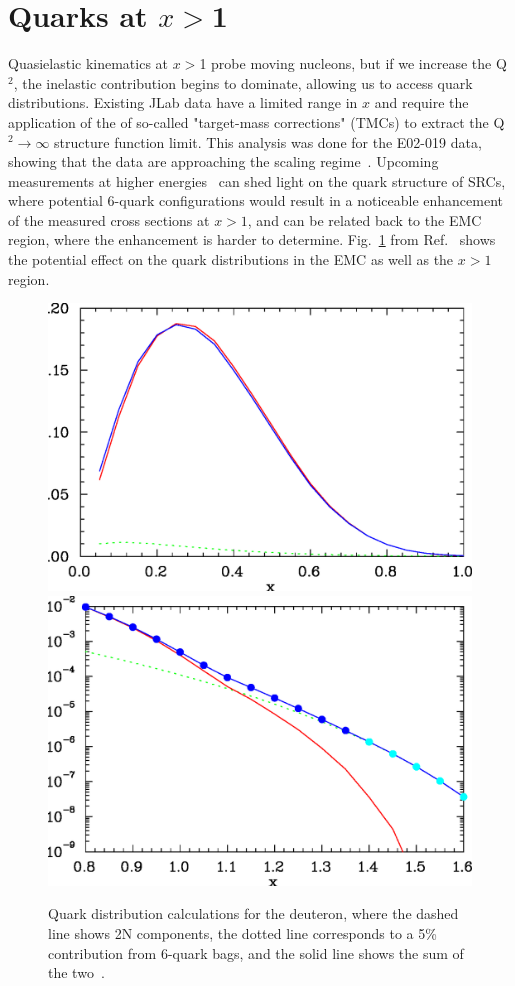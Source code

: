 \section{Quarks at $x>$1}
Quasielastic kinematics at $x>$1 probe moving nucleons, but if we increase the Q$^2$, the inelastic contribution begins to dominate, allowing us to access quark distributions. Existing JLab data have a limited range in $x$ and require the application of the of so-called "target-mass corrections" (TMCs) to extract the Q$^2\rightarrow\infty$ structure function limit.  This analysis was done for the E02-019 data, showing that the data are approaching the scaling regime~\cite{Fomin:2010ei}.  Upcoming measurements at higher energies~\cite{12gev_xgt1} can shed light on the quark structure of SRCs, where potential 6-quark configurations would result in a noticeable enhancement of the measured cross sections at $x>1$, and can be related back to the EMC region, where the enhancement is harder to determine.  Fig.~\ref{fig:quarkbags} from Ref.~\cite{Arrington:2003qt} shows the potential effect on the quark distributions in the EMC as well as the $x>1$ region.
\begin{figure}[tbp]
  \includegraphics[width=0.45\columnwidth]{plots/qofx2_lin_5per.eps}
  \includegraphics[width=0.45\columnwidth]{plots/qofx2_log_5per.eps}
  \caption{Quark distribution calculations for the deuteron, where the dashed line shows 2N components, the dotted line corresponds to a 5\% contribution from 6-quark bags, and the solid line shows the sum of the two~\cite{Mulders:1983au}. }
  \label{fig:quarkbags}
\end{figure}

